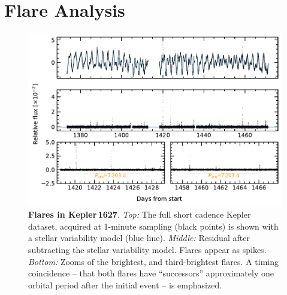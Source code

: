\documentclass[12pt,modern,twocolumn,tighten]{aastex63}
\begin{document}
\section{Flare Analysis}
\label{app:flare}

\begin{figure}[t]
	\begin{center}
		\leavevmode
		\includegraphics[width=1\textwidth]{f7.pdf}
	\end{center}
	\vspace{-0.7cm}
	\caption{
		{\bf Flares in Kepler\,1627}.  
    {\it Top:}
    The full short cadence Kepler dataset, acquired at 1-minute
    sampling (black points) is shown with a stellar variability model
    (blue line).
    {\it Middle:}
    Residual after subtracting the stellar variability model.  Flares
    appear as spikes.
    {\it Bottom:}
    Zooms of the brightest, and third-brightest flares.  A timing
    coincidence -- that both flares have ``successors'' approximately
    one orbital period after the initial event -- is emphasized.
		\label{fig:flarezoom}
	}
\end{figure}
\end{document}
